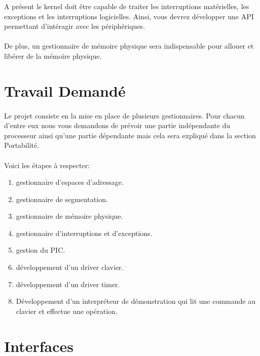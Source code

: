 \documentclass[10pt,a4wide]{article}
\begin{document}
A pr\'esent le kernel doit \^etre capable de traiter les interruptions
mat\'erielles, les exceptions et les interruptions logicielles. Ainsi,
vous devrez d\'evelopper une API permettant d'int\'eragir avec les
p\'eriph\'eriques.

\paragraph{}

De plus, un gestionnaire de m\'emoire physique sera indispensable pour allouer
et lib\'erer de la m\'emoire physique.

\section{Travail Demand\'e}

\paragraph{}

Le projet consiste en la mise en place de plusieurs gestionnaires. Pour chacun
d'entre eux nous vous demandons de pr\'evoir une partie ind\'ependante du
processeur ainsi qu'une partie d\'ependante mais cela sera expliqu\'e
dans la section Portabilit\'e.

\paragraph{}

Voici les \'etapes \`a respecter:

\begin{enumerate}
\item gestionnaire d'espaces d'adressage.
\item gestionnaire de segmentation.
\item gestionnaire de m\'emoire physique.
\item gestionnaire d'interruptions et d'exceptions.
\item gestion du PIC.
\item d\'eveloppement d'un driver clavier.
\item d\'eveloppement d'un driver timer.
\item D\'eveloppement d'un interpr\'eteur de d\'emonstration qui lit
      une commande au clavier et effectue une op\'eration.
\end{enumerate}

\section{Interfaces}
\end{document}
